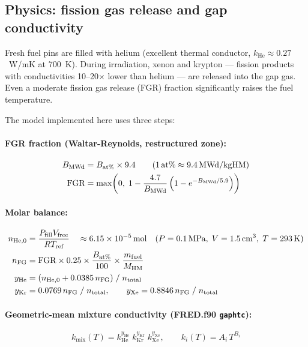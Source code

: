 \documentclass[11pt,a4paper]{article}
\begin{document}
\subsection{Physics: fission gas release and gap conductivity}

Fresh fuel pins are filled with helium (excellent thermal conductor,
$k_\text{He} \approx 0.27$~W/mK at 700~K).  During irradiation, xenon and
krypton --- fission products with conductivities 10--20$\times$ lower than
helium --- are released into the gap gas.  Even a moderate fission gas
release (FGR) fraction significantly raises the fuel temperature.

The model implemented here uses three steps:

\paragraph{FGR fraction (Waltar-Reynolds, restructured zone):}
\begin{align}
  B_\text{MWd} &= B_\text{at\%} \times 9.4
  \qquad (1\,\text{at\%} \approx 9.4\,\text{MWd/kgHM}) \notag\\
  \text{FGR} &= \max\!\left(0,\; 1 - \frac{4.7}{B_\text{MWd}}
                \left(1 - e^{-B_\text{MWd}/5.9}\right)\right)
\end{align}

\paragraph{Molar balance:}
\begin{align}
  n_{\text{He},0} &= \frac{P_\text{fill} V_\text{free}}{RT_\text{ref}}
  \quad\approx 6.15\times10^{-5}\,\text{mol}
  \quad (P=0.1\,\text{MPa},\; V=1.5\,\text{cm}^3,\; T=293\,\text{K})
  \notag\\
  n_\text{FG} &= \text{FGR} \times 0.25 \times
                \frac{B_\text{at\%}}{100} \times \frac{m_\text{fuel}}{M_\text{HM}}
  \notag\\
  y_\text{He} &= (n_{\text{He},0} + 0.0385\,n_\text{FG})\;/\;n_\text{total}
  \notag\\
  y_\text{Kr} &= 0.0769\,n_\text{FG}\;/\;n_\text{total},
  \qquad
  y_\text{Xe} = 0.8846\,n_\text{FG}\;/\;n_\text{total}
\end{align}

\paragraph{Geometric-mean mixture conductivity (FRED.f90 \texttt{gaphtc}):}
\begin{equation}
  k_\text{mix}(T) = k_\text{He}^{y_\text{He}}\;
                    k_\text{Kr}^{y_\text{Kr}}\;
                    k_\text{Xe}^{y_\text{Xe}},
  \qquad k_i(T) = A_i\, T^{B_i}
\end{equation}
\end{document}

